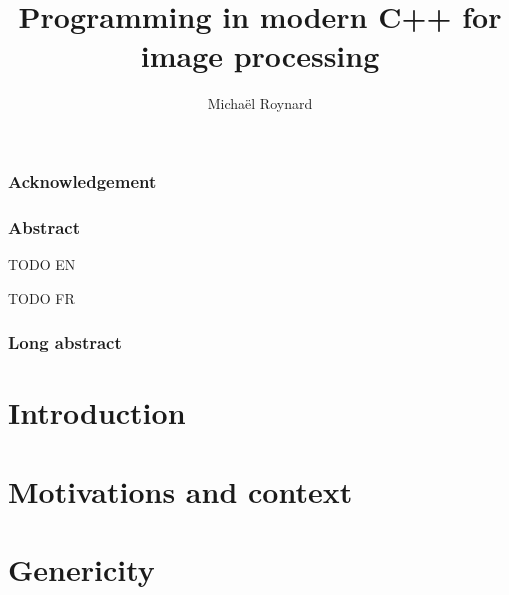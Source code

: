 \documentclass[11pt]{book}
\begin{document}
%
\title{Programming in modern C++ for image processing}


\author{Michaël Roynard}



\maketitle

\section{Acknowledgement}
\label{sec.acknowledgement}


\section{Abstract}
\label{sec.abstract}
TODO EN

TODO FR

\section{Long abstract}
\label{sec.long_abstract}


\tableofcontents
\label{table.of.contents}

\listoffigures
\label{list.of.figures}

\listoftables
\label{list.of.tables}

\cleardoublepage


\part{Introduction}
\label{part.introduction}



\cleardoublepage


\part{Motivations and context}
\label{part.motivations_and_context}



\cleardoublepage


\part{Genericity}
\label{part.genericity}
\end{document}
